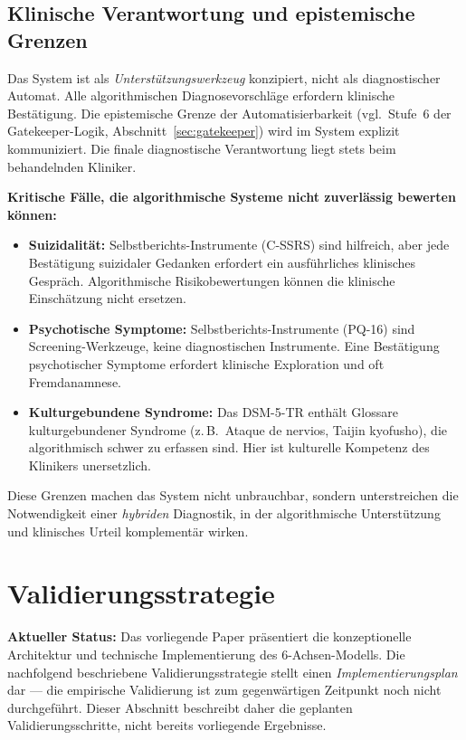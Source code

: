 \documentclass[11pt,a4paper]{article}
\begin{document}
\subsection{Klinische Verantwortung und epistemische Grenzen}

Das System ist als \textit{Unterst\"utzungswerkzeug} konzipiert, nicht als diagnostischer Automat. Alle algorithmischen Diagnosevorschl\"age erfordern klinische Best\"atigung. Die epistemische Grenze der Automatisierbarkeit (vgl.\ Stufe~6 der Gatekeeper-Logik, Abschnitt~\ref{sec:gatekeeper}) wird im System explizit kommuniziert. Die finale diagnostische Verantwortung liegt stets beim behandelnden Kliniker.

\textbf{Kritische F\"alle, die algorithmische Systeme nicht zuverl\"assig bewerten k\"onnen:}
\begin{itemize}[noitemsep]
\item \textbf{Suizidalit\"at:} Selbstberichts-Instrumente (C-SSRS) sind hilfreich, aber jede Best\"atigung suizidaler Gedanken erfordert ein ausf\"uhrliches klinisches Gespr\"ach. Algorithmische Risikobewertungen k\"onnen die klinische Einsch\"atzung nicht ersetzen.
\item \textbf{Psychotische Symptome:} Selbstberichts-Instrumente (PQ-16) sind Screening-Werkzeuge, keine diagnostischen Instrumente. Eine Best\"atigung psychotischer Symptome erfordert klinische Exploration und oft Fremdanamnese.
\item \textbf{Kulturgebundene Syndrome:} Das DSM-5-TR enth\"alt Glossare kulturgebundener Syndrome (z.\,B.\ Ataque de nervios, Taijin kyofusho), die algorithmisch schwer zu erfassen sind. Hier ist kulturelle Kompetenz des Klinikers unersetzlich.
\end{itemize}

Diese Grenzen machen das System nicht unbrauchbar, sondern unterstreichen die Notwendigkeit einer \textit{hybriden} Diagnostik, in der algorithmische Unterst\"utzung und klinisches Urteil komplementär wirken.


\section{Validierungsstrategie}
\label{sec:validierung}

\textbf{Aktueller Status:} Das vorliegende Paper pr\"asentiert die konzeptionelle Architektur und technische Implementierung des 6-Achsen-Modells. Die nachfolgend beschriebene Validierungsstrategie stellt einen \textit{Implementierungsplan} dar --- die empirische Validierung ist zum gegenw\"artigen Zeitpunkt noch nicht durchgef\"uhrt. Dieser Abschnitt beschreibt daher die geplanten Validierungsschritte, nicht bereits vorliegende Ergebnisse.
\end{document}
